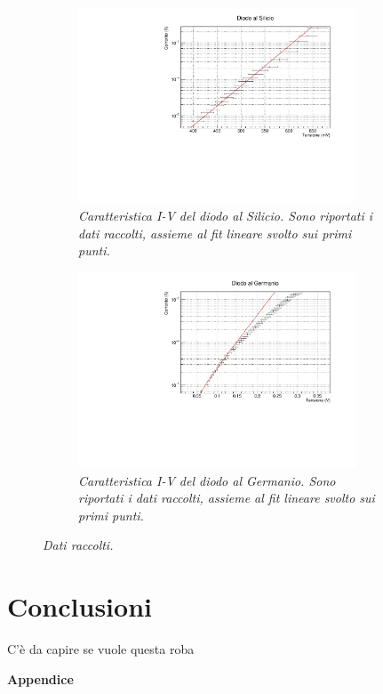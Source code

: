 \documentclass[11pt, a4paper, twoside]{article}
\begin{document}
  \begin{figure}%
    \centering
    \begin{subfigure}[t]{.47\textwidth}
      \includegraphics[width=8.25cm]{./assets/1/SilicioBlu.pdf}
      \caption{
        \emph{
          Caratteristica I-V del diodo al Silicio. Sono riportati i dati raccolti, assieme al fit lineare svolto sui primi punti.
        }
      }
      \label{fig:caratteristica-silicio}
    \end{subfigure}
    \hspace{5mm}
    \begin{subfigure}[t]{.47\textwidth}
      \includegraphics[width=8.25cm]{./assets/1/Germanio2.pdf}
      \caption{
        \emph{
           Caratteristica I-V del diodo al Germanio. Sono riportati i dati raccolti, assieme al fit lineare svolto sui primi punti.
        }
      }
      \label{fig:caratteristica-germanio}
    \end{subfigure}
    \caption{\emph{Dati raccolti.}
    \label{fig:caratteristiche-iv}}
  \end{figure}

\section{Conclusioni}\label{sec:conclusioni}
  C'è da capire se vuole questa roba

\newpage
\appendix
\textbf{\huge{Appendice}}
\end{document}
